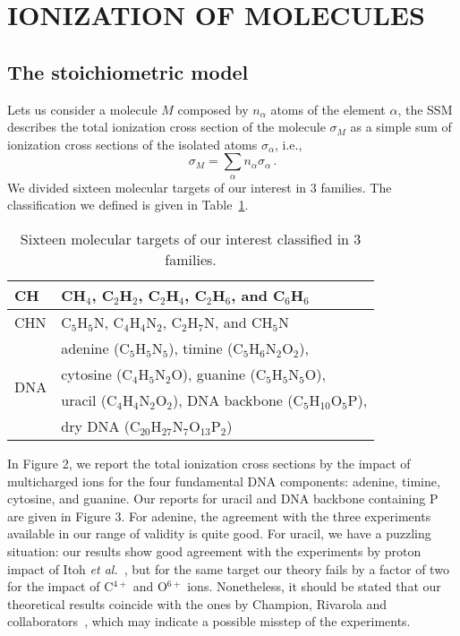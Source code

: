 \documentclass[preprint,showpacs,pra]{revtex4-1}
\begin{document}
\section{IONIZATION OF MOLECULES}

\subsection{The stoichiometric model}

Lets us consider a molecule $M$ composed by $n_{\alpha}$ atoms of the
element $\alpha$, the SSM describes the total ionization cross section 
of the molecule $\sigma_{M}$ as a simple sum of ionization cross 
sections of the isolated atoms $\sigma_{\alpha}$, i.e.,
\begin{equation}
 \sigma_{M}=\sum\limits_{\alpha}n_{\alpha}\sigma_{\alpha}\,.  
 \label{10}
\end{equation}
We divided sixteen molecular targets of our interest in 3 families. 
The classification we defined is given in Table~\ref{tab:families}.

\begin{table}
\begin{tabular}{|p{}|p{}|}
\hline
 CH  & CH$_4$, C$_2$H$_2$, C$_2$H$_4$, C$_2$H$_6$, and C$_6$H$_6$ \\
\hline
 CHN & C$_5$H$_5$N, C$_4$H$_4$N$_2$, C$_2$H$_7$N, and CH$_5$N \\
\hline
 \multirow{4}{*}{DNA} & adenine (C$_5$H$_5$N$_5$), timine (C$_5$H$_6$N$_2$O$_2$), \\
     & cytosine (C$_4$H$_5$N$_2$O), guanine (C$_5$H$_5$N$_5$O), \\
     & uracil (C$_4$H$_4$N$_2$O$_2$), DNA backbone (C$_5$H$_{10}$O$_5$P), \\
     & dry DNA (C$_{20}$H$_{27}$N$_7$O$_{13}$P$_2$)\\
\hline
\end{tabular}
\caption{Sixteen molecular targets of our interest classified in 3 
\label{tab:families}
families.}
\end{table}

In Figure 2, we report the total ionization cross sections by the 
impact of multicharged ions for the four fundamental DNA components: 
adenine, timine, cytosine, and guanine. Our reports for uracil and 
DNA backbone containing P are given in Figure 3. For adenine, the 
agreement with the three experiments available in our range of validity 
is quite good. For uracil, we have a puzzling situation: our results 
show good agreement with the experiments by proton impact of Itoh 
{\it et al.}~\cite{itoh2013}, but for the same target our theory fails 
by a factor of two for the impact of C$^{4+}$ and O$^{6+}$ ions. 
Nonetheless, it should be stated that our theoretical results coincide 
with the ones by Champion, Rivarola and 
collaborators~\cite{champion2012,agnihotri2012}, which may indicate a 
possible misstep of the experiments.
\end{document}

